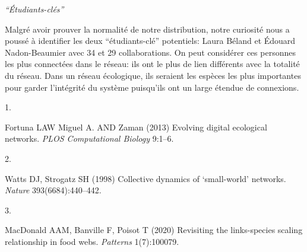 \documentclass[9pt,twocolumn,twoside,]{pnas-new}
\newlength{\cslhangindent}
\newlength{\csllabelwidth}
\newlength{\cslentryspacingunit} %
\newenvironment{CSLReferences}[2] %
 {%
  \setlength{\parindent}{0pt}
  \ifodd #1
  \let\oldpar\par
  \def\par{\hangindent=\cslhangindent\oldpar}
  \fi
  \setlength{\parskip}{#2\cslentryspacingunit}
 }%
 {}
\newcommand{\CSLLeftMargin}[1]{\parbox[t]{\csllabelwidth}{#1}}
\newcommand{\CSLRightInline}[1]{\parbox[t]{\linewidth - \csllabelwidth}{#1}\break}
\begin{document}
\emph{``Étudiants-clés''}

Malgré avoir prouver la normalité de notre distribution, notre curiosité
nous a poussé à identifier les deux ``étudiants-clé'' potentiels: Laura
Béland et Édouard Nadon-Beaumier avec 34 et 29 collaborations. On peut
considérer ces personnes les plus connectées dans le réseau: ils ont le
plus de lien différents avec la totalité du réseau. Dans un réseau
écologique, ils seraient les espèces les plus importantes pour garder
l'intégrité du système puisqu'ils ont un large étendue de connexions.

\hypertarget{refs}{}
\begin{CSLReferences}{0}{0}
\leavevmode{}%
\CSLLeftMargin{1. }
\CSLRightInline{Fortuna LAW Miguel A. AND Zaman (2013) Evolving digital
ecological networks. \emph{PLOS Computational Biology} 9:1--6.}

\leavevmode{}%
\CSLLeftMargin{2. }
\CSLRightInline{Watts DJ, Strogatz SH (1998) Collective dynamics of
{`small-world'} networks. \emph{Nature} 393(6684):440--442.}

\leavevmode{}%
\CSLLeftMargin{3. }
\CSLRightInline{MacDonald AAM, Banville F, Poisot T (2020) Revisiting
the links-species scaling relationship in food webs. \emph{Patterns}
1(7):100079.}

\end{CSLReferences}



% 
\end{document}

